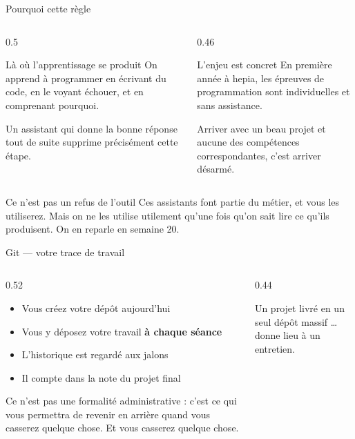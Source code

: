 \documentclass[aspectratio=169,11pt]{beamer}
\begin{document}
\begin{frame}{Pourquoi cette règle}
  \begin{columns}[T]
    \begin{column}{0.5\textwidth}
      \begin{block}{Là où l'apprentissage se produit}
        On apprend à programmer en écrivant du code, en le voyant échouer, et en comprenant pourquoi.
        \medskip

        Un assistant qui donne la bonne réponse tout de suite supprime précisément cette étape.
      \end{block}
    \end{column}
    \begin{column}{0.46\textwidth}
      \begin{alertblock}{L'enjeu est concret}
        En première année à hepia, les épreuves de programmation sont individuelles et sans assistance.
        \medskip

        Arriver avec un beau projet et aucune des compétences correspondantes, c'est arriver désarmé.
      \end{alertblock}
    \end{column}
  \end{columns}
  \vspace{0.35cm}
  \begin{exampleblock}{Ce n'est pas un refus de l'outil}
    Ces assistants font partie du métier, et vous les utiliserez. Mais on ne les utilise utilement qu'une fois qu'on sait lire ce qu'ils produisent. On en reparle en semaine 20.
  \end{exampleblock}
\end{frame}

\begin{frame}{Git --- votre trace de travail}
  \begin{columns}[T]
    \begin{column}{0.52\textwidth}
      \begin{itemize}
        \item Vous créez votre dépôt aujourd'hui
        \item Vous y déposez votre travail \textbf{à chaque séance}
        \item L'historique est regardé aux jalons
        \item Il compte dans la note du projet final
      \end{itemize}
      \medskip
      Ce n'est pas une formalité administrative : c'est ce qui vous permettra de revenir en arrière quand vous casserez quelque chose. Et vous casserez quelque chose.
    \end{column}
    \begin{column}{0.44\textwidth}
      \begin{alertblock}{Un projet livré en un seul dépôt massif}
        \dots donne lieu à un entretien.
      \end{alertblock}
    \end{column}
  \end{columns}
\end{frame}
\end{document}
